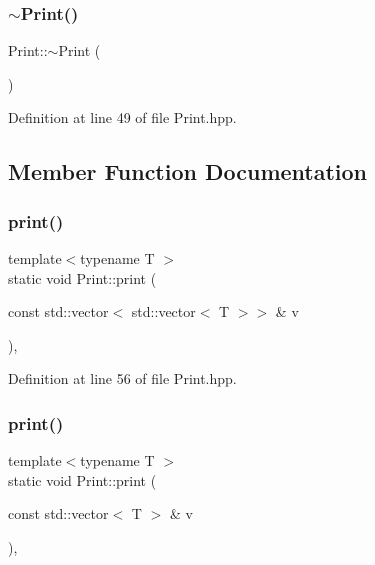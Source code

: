 \mbox{\label{class_print_afe336c40d17eeccba970a1db714da1b5}} 
\subsubsection{\texorpdfstring{$\sim$Print()}{~Print()}}
{\footnotesize\ttfamily Print\+::$\sim$\+Print (\begin{DoxyParamCaption}{ }\end{DoxyParamCaption})\hspace{0.3cm}{\ttfamily [inline]}}



Definition at line 49 of file Print.\+hpp.



\subsection{Member Function Documentation}
\mbox{\label{class_print_ac634af53bf8c46bf58a8e538d883507d}} 
\subsubsection{\texorpdfstring{print()}{print()}\hspace{0.1cm}{\footnotesize\ttfamily [1/4]}}
{\footnotesize\ttfamily template$<$typename T $>$ \\
static void Print\+::print (\begin{DoxyParamCaption}\item[{const std\+::vector$<$ std\+::vector$<$ T $>$$>$ \&}]{v }\end{DoxyParamCaption})\hspace{0.3cm}{\ttfamily [inline]}, {\ttfamily [static]}}



Definition at line 56 of file Print.\+hpp.

\mbox{\label{class_print_a25829c4ccba037ef74becfa62d6df8e6}} 
\subsubsection{\texorpdfstring{print()}{print()}\hspace{0.1cm}{\footnotesize\ttfamily [2/4]}}
{\footnotesize\ttfamily template$<$typename T $>$ \\
static void Print\+::print (\begin{DoxyParamCaption}\item[{const std\+::vector$<$ T $>$ \&}]{v }\end{DoxyParamCaption})\hspace{0.3cm}{\ttfamily [inline]}, {\ttfamily [static]}}



